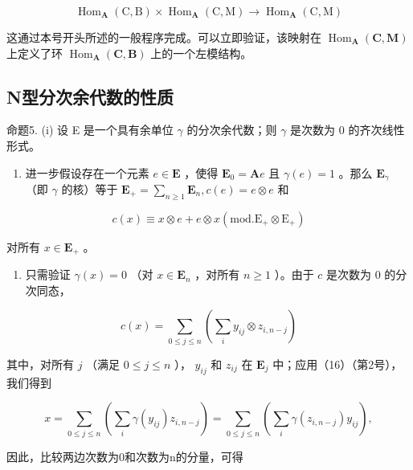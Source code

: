 \[
\operatorname{Hom} _ {\mathbf {A}} (\mathrm{C}, \mathrm{B}) \times \operatorname{Hom} _ {\mathbf {A}} (\mathrm{C}, \mathrm{M}) \rightarrow \operatorname{Hom} _ {\mathbf {A}} (\mathrm{C}, \mathrm{M})
\]

这通过本号开头所述的一般程序完成。可以立即验证，该映射在 \(\operatorname{Hom}_{\mathbf{A}}(\mathbf{C}, \mathbf{M})\) 上定义了环 \(\operatorname{Hom}_{\mathbf{A}}(\mathbf{C}, \mathbf{B})\) 上的一个左模结构。

\subsection{N型分次余代数的性质}

命题5. (i) 设 E 是一个具有余单位 \(\gamma\) 的分次余代数；则 \(\gamma\) 是次数为 0 的齐次线性形式。

\begin{enumerate}
\def\labelenumi{(\roman{enumi})}
\setcounter{enumi}{1}
\tightlist
\item
  进一步假设存在一个元素 \(e \in \mathbf{E}\) ，使得 \(\mathbf{E}_0 = \mathbf{A}e\) 且 \(\gamma(e) = 1\) 。那么 \(\mathbf{E}_{\gamma}\) （即 \(\gamma\) 的核）等于 \(\mathbf{E}_{+} = \sum_{n \geqslant 1} \mathbf{E}_n, c(e) = e \otimes e\) 和
\end{enumerate}

\[
c (x) \equiv x \otimes e + e \otimes x (\mathrm{mod.} \mathrm{E} _ {+} \otimes \mathrm{E} _ {+})\tag{19}
\]

对所有 \(x \in \mathbf{E}_{+}\) 。

\begin{enumerate}
\def\labelenumi{(\roman{enumi})}
\tightlist
\item
  只需验证 \(\gamma(x) = 0\) （对 \(x \in \mathbf{E}_n\) ，对所有 \(n \geqslant 1\) ）。由于 \(c\) 是次数为 0 的分次同态，
\end{enumerate}

\[
c (x) = \sum_ {0 \leqslant j \leqslant n} \left(\sum_ {i} y _ {i j} \otimes z _ {i, n - j}\right)\tag{20}
\]

其中，对所有 \(j\) （满足 \(0 \leqslant j \leqslant n\) ）， \(y_{ij}\) 和 \(z_{ij}\) 在 \(\mathbf{E}_j\) 中；应用（16）（第2号），我们得到

\[
x = \sum_ {0 \leqslant j \leqslant n} \left(\sum_ {i} \gamma (y _ {i j}) z _ {i, n - j}\right) = \sum_ {0 \leqslant j \leqslant n} \left(\sum_ {i} \gamma (z _ {i, n - j}) y _ {i j}\right),
\]

因此，比较两边次数为0和次数为n的分量，可得

